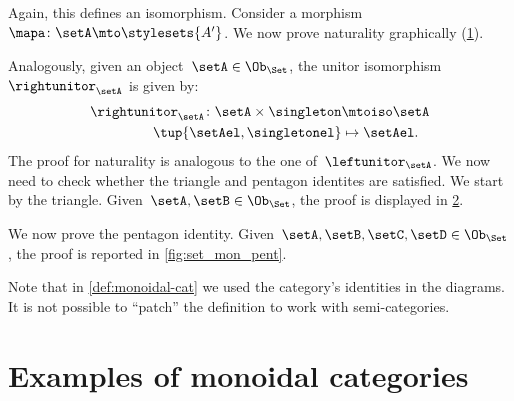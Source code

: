 \begin{example}
    Again, this defines an isomorphism.
    Consider a morphism~$\mapa\colon \setA\mto \stylesets{A'}$.
    We now prove naturality graphically (\cref{fig:monoidal_set_unit_nat}).

    \begin{figure}[h!]
        \centering
        \caption{}
        \label{fig:monoidal_set_unit_nat}
    \end{figure}

    Analogously, given an object~$\setA\in \Ob_{\Set}$, the unitor isomorphism~$\rightunitor_\setA$ is given by:
    \begin{equation*}
        \label{eq:set_mon_prod_5}
        \begin{aligned}
            \rightunitor_\setA\colon \setA\times \singleton &\mtoiso \setA\\
            \tup{\setAel,\singletonel}&\mapsto \setAel.
        \end{aligned}
    \end{equation*}
    The proof for naturality is analogous to the one of~$\leftunitor_\setA$.
    We now need to check whether the triangle and pentagon identites are satisfied.
    We start by the triangle. Given~$\setA,\setB\in \Ob_{\Set}$, the proof is displayed in \cref{fig:set_mon_triangle}.

    \begin{figure}[h]
        \centering
        \caption{}
        \label{fig:set_mon_triangle}
    \end{figure}

    We now prove the pentagon identity.
    Given~$\setA,\setB,\setC,\setD\in \Ob_\Set$, the proof is reported in \cref{fig:set_mon_pent}.

    \begin{figure*}[h]
        \centering
        \caption{}
        \label{fig:set_mon_pent}
    \end{figure*}
\end{example}

\begin{remark}
    Note that in \cref{def:monoidal-cat} we used the category's identities in the diagrams. It is not possible to ``patch'' the definition to work with semi-categories.
\end{remark}


\section{Examples of monoidal categories}

